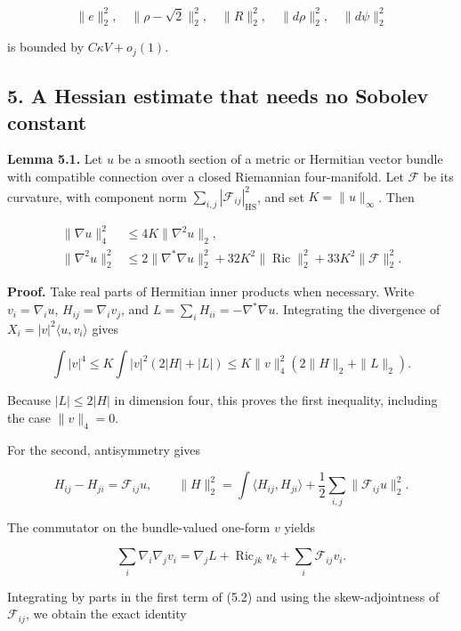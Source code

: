 \documentclass[
  10pt,
]{article}
\begin{document}
\[
 \|e\|_2^2,\quad\|\rho-\sqrt2\|_2^2,\quad\|R\|_2^2,
            \quad\|d\rho\|_2^2,\quad\|d\psi\|_2^2
\]

is bounded by \(C\kappa V+o_j(1)\).

\hypertarget{a-hessian-estimate-that-needs-no-sobolev-constant}{%
\subsection{5. A Hessian estimate that needs no Sobolev
constant}\label{a-hessian-estimate-that-needs-no-sobolev-constant}}

\textbf{Lemma 5.1.} Let \(u\) be a smooth section of a metric or
Hermitian vector bundle with compatible connection over a closed
Riemannian four-manifold. Let \(\mathscr F\) be its curvature, with
component norm \(\sum_{i,j}|\mathscr F_{ij}|_{\mathrm{HS}}^2\), and set
\(K=\|u\|_\infty\). Then

\[
 \begin{aligned}
 \|\nabla u\|_4^2&\le4K\|\nabla^2u\|_2,\\
 \|\nabla^2u\|_2^2
 &\le2\|\nabla^*\nabla u\|_2^2
       +32K^2\|\operatorname{Ric}\|_2^2
       +33K^2\|\mathscr F\|_2^2.
 \end{aligned}                                              \tag{5.1}
\]

\textbf{Proof.} Take real parts of Hermitian inner products when
necessary. Write \(v_i=\nabla_i u\), \(H_{ij}=\nabla_i v_j\), and
\(L=\sum_iH_{ii}=-\nabla^*\nabla u\). Integrating the divergence of
\(X_i=|v|^2\langle u,v_i\rangle\) gives

\[
 \int|v|^4
 \le K\int |v|^2(2|H|+|L|)
 \le K\|v\|_4^2(2\|H\|_2+\|L\|_2).
\]

Because \(|L|\le2|H|\) in dimension four, this proves the first
inequality, including the case \(\|v\|_4=0\).

For the second, antisymmetry gives

\[
 H_{ij}-H_{ji}=\mathscr F_{ij}u,\qquad
 \|H\|_2^2=\int\langle H_{ij},H_{ji}\rangle
                         +\frac12\sum_{i,j}\|\mathscr F_{ij}u\|_2^2.
 \tag{5.2}
\]

The commutator on the bundle-valued one-form \(v\) yields

\[
 \sum_i\nabla_i\nabla_jv_i
     =\nabla_jL+\operatorname{Ric}_{jk}v_k
                                      +\sum_i\mathscr F_{ij}v_i.
\]

Integrating by parts in the first term of (5.2) and using the
skew-adjointness of \(\mathscr F_{ij}\), we obtain the exact identity
\end{document}
